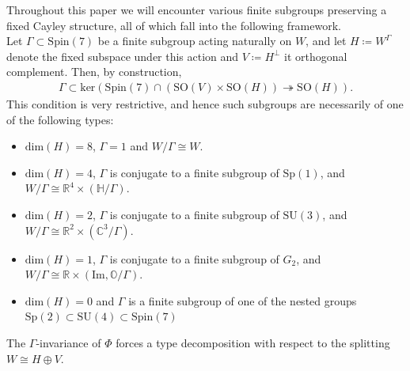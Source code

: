 \documentclass[psamsfonts]{amsart}
\theoremstyle{plain}
\theoremstyle{definition}{
\newtheorem{defi}{Definition}[section]
\newtheorem{ass}{Assumption}
\newtheorem*{nota}{Notation}}
\theoremstyle{remark}{
\newtheorem{rem}{Remark}
\newtheorem{ex}{Example}}
\theoremstyle{plain}{
\newtheorem{thm}{Theorem}[section]
\newtheorem{lem}{Lemma}[section]
\newtheorem{cor}{Corollary}[section]
\newtheorem{prop}{Proposition}[section]
\newtheorem{con}{Conjecture}[section]}
\newcommand{\m}[1]{{\mathrm{#1}}}
\begin{document}
Throughout this paper we will encounter various finite subgroups preserving a fixed Cayley structure, all of which fall into the following framework.\\

Let $\Gamma \subset \mathrm{Spin}(7)$ be a finite subgroup acting naturally on $W$, and let $H \coloneqq W^\Gamma$ denote the fixed subspace under this action and $V\coloneqq H^\perp$ it orthogonal complement. Then, by construction,
\begin{align*}
    \Gamma \subset \m{ker} \left( \mathrm{Spin}(7)\cap \left(\m{SO}(V)\times \m{SO}(H) \right) \twoheadrightarrow \mathrm{SO}(H) \right).
\end{align*}
This condition is very restrictive, and hence such subgroups are necessarily of one of the following types:

\begin{itemize}
\item[(1)] $\m{dim} (H) = 8$, $\Gamma = {1}$ and $W/\Gamma \cong W$.
\item[(2)] $\m{dim} (H) = 4$, $\Gamma$ is conjugate to a finite subgroup of $\mathrm{Sp}(1)$, and $W/\Gamma \cong \mathbb{R}^4 \times (\mathbb{H}/\Gamma)$.
\item[(3)] $\m{dim} (H) = 2$, $\Gamma$ is conjugate to a finite subgroup of $\mathrm{SU}(3)$, and $W/\Gamma \cong \mathbb{R}^2 \times (\mathbb{C}^3/\Gamma)$.
\item[(4)] $\m{dim} (H) = 1$, $\Gamma$ is conjugate to a finite subgroup of $G_2$, and $W/\Gamma \cong \mathbb{R} \times (\mathrm{Im},\mathbb{O}/\Gamma)$.
\item[(5)] $\m{dim} (H) = 0$ and $\Gamma$ is a finite subgroup of one of the nested groups $\m{Sp}(2)\subset\m{SU}(4)\subset\m{Spin}(7)$
\end{itemize}

The $\Gamma$-invariance of $\Phi$ forces a type decomposition with respect to the splitting $W\cong H\oplus V$.\\ 
\end{document}
